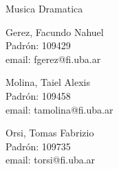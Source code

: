 \documentclass{article}
\begin{document}
\begin{titlepage}
  \vspace{0.4cm}
  \begin{center}
    {\Large{Musica Dramatica}}\\
    \vspace{0.6cm}
    {\begin{minipage}[t]{.32\textwidth}
        \begin{center}
          Gerez, Facundo Nahuel\\
          {\small{Padrón: 109429}}\\
          {\small{email: fgerez@fi.uba.ar}}
        \end{center}
	\end{minipage}
	\begin{minipage}[t]{.32\textwidth}
        \begin{center}
          Molina, Taiel Alexis\\
          {\small{Padrón: 109458}}\\
          {\small{email: tamolina@fi.uba.ar}}\\
        \end{center}
      \end{minipage}
      \begin{minipage}[t]{.32\textwidth}
        \begin{center}
          Orsi, Tomas Fabrizio\\
          {\small{Padrón: 109735}}\\
          {\small{email: torsi@fi.uba.ar}}
        \end{center}
      \end{minipage}}
  \end{center}
\end{titlepage}
\end{document}
